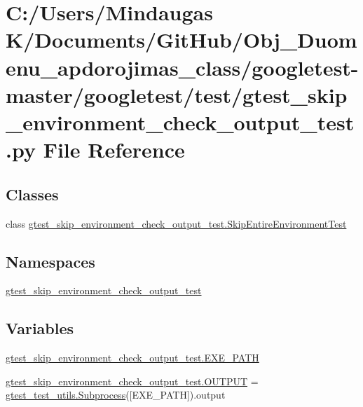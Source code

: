 \hypertarget{googletest-master_2googletest_2test_2gtest__skip__environment__check__output__test_8py}{}\section{C\+:/\+Users/\+Mindaugas K/\+Documents/\+Git\+Hub/\+Obj\+\_\+\+Duomenu\+\_\+apdorojimas\+\_\+class/googletest-\/master/googletest/test/gtest\+\_\+skip\+\_\+environment\+\_\+check\+\_\+output\+\_\+test.py File Reference}
\label{googletest-master_2googletest_2test_2gtest__skip__environment__check__output__test_8py}
\subsection*{Classes}
\begin{DoxyCompactItemize}
\item 
class \mbox{\hyperlink{classgtest__skip__environment__check__output__test_1_1_skip_entire_environment_test}{gtest\+\_\+skip\+\_\+environment\+\_\+check\+\_\+output\+\_\+test.\+Skip\+Entire\+Environment\+Test}}
\end{DoxyCompactItemize}
\subsection*{Namespaces}
\begin{DoxyCompactItemize}
\item 
 \mbox{\hyperlink{namespacegtest__skip__environment__check__output__test}{gtest\+\_\+skip\+\_\+environment\+\_\+check\+\_\+output\+\_\+test}}
\end{DoxyCompactItemize}
\subsection*{Variables}
\begin{DoxyCompactItemize}
\item 
\mbox{\hyperlink{namespacegtest__skip__environment__check__output__test_ae1287ce2baf8d77448f38ca980c1b736}{gtest\+\_\+skip\+\_\+environment\+\_\+check\+\_\+output\+\_\+test.\+E\+X\+E\+\_\+\+P\+A\+TH}}
\item 
\mbox{\hyperlink{namespacegtest__skip__environment__check__output__test_af9bbddca6e3449b9c998df24fbf081cf}{gtest\+\_\+skip\+\_\+environment\+\_\+check\+\_\+output\+\_\+test.\+O\+U\+T\+P\+UT}} = \mbox{\hyperlink{classgtest__test__utils_1_1_subprocess}{gtest\+\_\+test\+\_\+utils.\+Subprocess}}(\mbox{[}E\+X\+E\+\_\+\+P\+A\+TH\mbox{]}).output
\end{DoxyCompactItemize}

